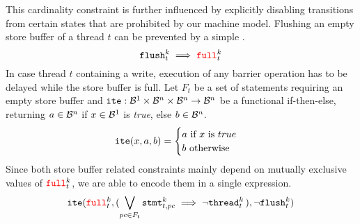 This cardinality constraint is further influenced by explicitly disabling transitions from certain states that are prohibited by our machine model.
Flushing an empty store buffer of a thread $t$ can be prevented by a simple .
\[
  \FLUSH^k_t \implies \SBFULL^k_t
\]
In case thread $t$ containing a write, execution of any barrier operation has to be delayed while the store buffer is full.
Let $F_t$ be a set of statements requiring an empty store buffer
and $\ITE: \BVSORT[1] \times \BVSORT[n] \times \BVSORT[n] \to \BVSORT[n]$ be a functional if-then-else, returning $a \in \BVSORT[n]$ if $x \in \BVSORT[1]$ is \emph{true}, else $b \in \BVSORT[n]$.
\[
  \ITE(x, a, b) =
  \begin{cases}
    a \text{ if } x \text{ is } true \\
    b \text{ otherwise}
  \end{cases}
\]
Since both store buffer related constraints mainly depend on mutually exclusive values of $\SBFULL^k_t$, we are able to encode them in a single expression.
\[
  \ITE(\SBFULL^k_t, ( \bigvee_{pc \in F_t} \STMT^k_{t, pc} \implies \lnot \THREAD^k_t \,), \lnot \FLUSH^k_t)
\]
